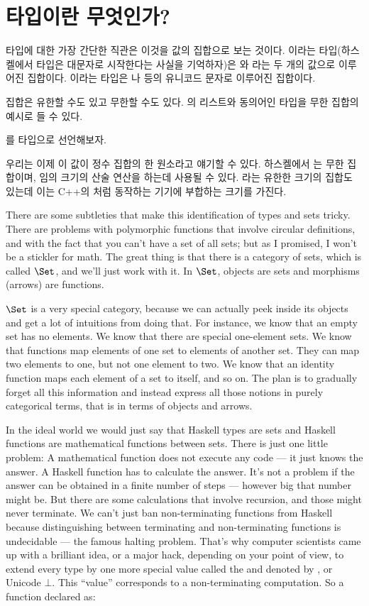 \section{타입이란 무엇인가?}

타입에 대한 가장 간단한 직관은 이것을 값의 집합으로 보는 것이다.
이라는 타입(하스켈에서 타입은 대문자로 시작한다는 사실을 기억하자)은 와 라는 두 개의 값으로 이루어진 집합이다.
이라는 타입은 나  등의 유니코드 문자로 이루어진 집합이다.

집합은 유한할 수도 있고 무한할 수도 있다. 의 리스트와 동의어인  타입을 무한 집합의 예시로 들 수 있다.

를  타입으로 선언해보자.

우리는 이제 이 값이 정수 집합의 한 원소라고 얘기할 수 있다.
하스켈에서 는 무한 집합이며, 임의 크기의 산술 연산을 하는데 사용될 수 있다. 라는 유한한 크기의 집합도 있는데 이는 C++의 처럼 동작하는 기기에 부합하는 크기를 가진다.


There are some subtleties that make this identification of types and
sets tricky. There are problems with polymorphic functions that involve
circular definitions, and with the fact that you can't have a set of all
sets; but as I promised, I won't be a stickler for math. The great thing
is that there is a category of sets, which is called $\Set$, and
we'll just work with it. In $\Set$, objects are sets and morphisms
(arrows) are functions.

$\Set$ is a very special category, because we can actually peek
inside its objects and get a lot of intuitions from doing that. For
instance, we know that an empty set has no elements. We know that there
are special one-element sets. We know that functions map elements of one
set to elements of another set. They can map two elements to one, but
not one element to two. We know that an identity function maps each
element of a set to itself, and so on. The plan is to gradually forget
all this information and instead express all those notions in purely
categorical terms, that is in terms of objects and arrows.

In the ideal world we would just say that Haskell types are sets and
Haskell functions are mathematical functions between sets. There is just
one little problem: A mathematical function does not execute any code
--- it just knows the answer. A Haskell function has to calculate the
answer. It's not a problem if the answer can be obtained in a finite
number of steps --- however big that number might be. But there are some
calculations that involve recursion, and those might never terminate. We
can't just ban non-terminating functions from Haskell because
distinguishing between terminating and non-terminating functions is
undecidable --- the famous halting problem. That's why computer
scientists came up with a brilliant idea, or a major hack, depending on
your point of view, to extend every type by one more special value
called the  and denoted by \code{\_|\_}, or
Unicode $\bot$. This ``value'' corresponds to a non-terminating computation.
So a function declared as:

